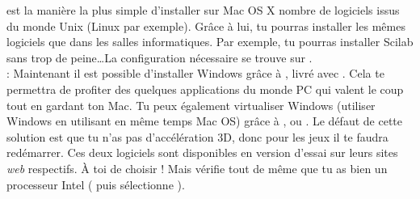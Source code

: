 
\noindent{} est la manière la plus simple d'installer sur Mac OS X nombre de logiciels issus du monde Unix (Linux par exemple). Grâce à lui, tu pourras installer les mêmes logiciels que dans les salles informatiques. Par exemple, tu pourras installer Scilab sans trop de peine\dots La configuration nécessaire se trouve sur . \\ 

\noindent {} : Maintenant il est possible d'installer Windows grâce à , livré avec . Cela te permettra de profiter des quelques applications du monde PC qui valent le coup tout en gardant ton Mac. Tu peux également virtualiser Windows (utiliser Windows en utilisant en même temps Mac OS) grâce à ,  ou . Le  défaut de cette solution est que tu n'as pas d'accélération 3D, donc pour les jeux il te faudra redémarrer. Ces deux logiciels sont disponibles en version d'essai sur leurs sites \emph{web} respectifs. \`A toi de choisir !
Mais vérifie tout de même que tu as bien un processeur Intel ( puis sélectionne ).

\clearpage
